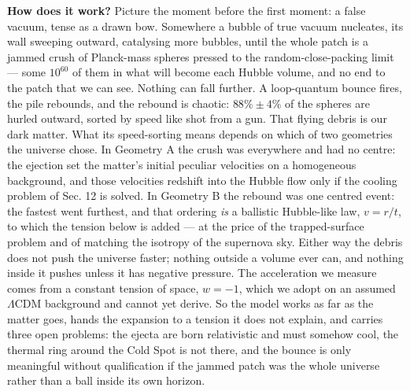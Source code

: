 \documentclass[
]{article}
\begin{document}
\textbf{How does it work?} Picture the moment before the first moment: a
false vacuum, tense as a drawn bow. Somewhere a bubble of true vacuum
nucleates, its wall sweeping outward, catalysing more bubbles, until the
whole patch is a jammed crush of Planck-mass spheres pressed to the
random-close-packing limit --- some \(10^{60}\) of them in what will
become each Hubble volume, and no end to the patch that we can see.
Nothing can fall further. A loop-quantum bounce fires, the pile
rebounds, and the rebound is chaotic: \(88\% \pm 4\%\) of the spheres
are hurled outward, sorted by speed like shot from a gun. That flying
debris is our dark matter. What its speed-sorting means depends on which
of two geometries the universe chose. In Geometry A the crush was
everywhere and had no centre: the ejection set the matter's initial
peculiar velocities on a homogeneous background, and those velocities
redshift into the Hubble flow only if the cooling problem of Sec. 12 is
solved. In Geometry B the rebound was one centred event: the fastest
went furthest, and that ordering \emph{is} a ballistic Hubble-like law,
\(v = r/t\), to which the tension below is added --- at the price of the
trapped-surface problem and of matching the isotropy of the supernova
sky. Either way the debris does not push the universe faster; nothing
outside a volume ever can, and nothing inside it pushes unless it has
negative pressure. The acceleration we measure comes from a constant
tension of space, \(w = -1\), which we adopt on an assumed
\(\Lambda\)CDM background and cannot yet derive. So the model works as
far as the matter goes, hands the expansion to a tension it does not
explain, and carries three open problems: the ejecta are born
relativistic and must somehow cool, the thermal ring around the Cold
Spot is not there, and the bounce is only meaningful without
qualification if the jammed patch was the whole universe rather than a
ball inside its own horizon.
\end{document}
